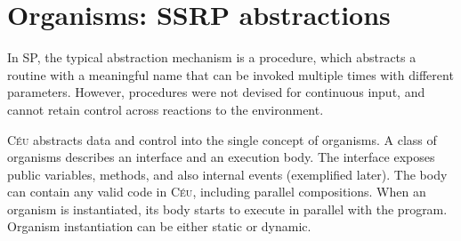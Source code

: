 \documentclass{sigplanconf}
\newcommand{\CEU}{\textsc{C\'{e}u}\xspace}
\newcommand{\1}{\;}
\newcommand{\2}{\;\;}
\newcommand{\3}{\;\;\;}
\newcommand{\5}{\;\;\;\;\;}
\begin{document}
\section{Organisms: SSRP abstractions}
\label{sec.orgs}


%
In SP, the typical abstraction mechanism is a procedure, which abstracts a 
routine with a meaningful name that can be invoked multiple times with 
different parameters.
%
However, procedures were not devised for continuous input, and cannot retain 
control across reactions to the environment.
%

\CEU abstracts data and control into the single concept of organisms.
%
A class of organisms describes an interface and an execution body.
The interface exposes public variables, methods, and also internal events 
(exemplified later).
The body can contain any valid code in \CEU, including parallel compositions.
When an organism is instantiated, its body starts to execute in parallel with 
the program.
Organism instantiation can be either static or dynamic.
\end{document}
